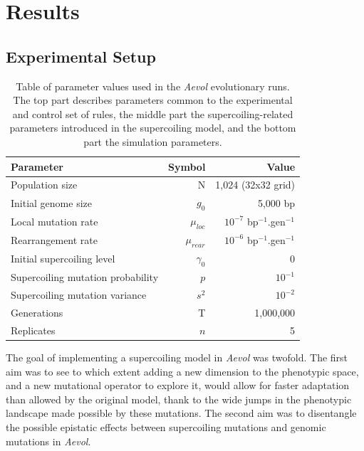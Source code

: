 \section{Results}
\label{sec:aevol:results}

\subsection{Experimental Setup}

\begin{table}[H]
  \begin{center}
    \begin{tabular}{ l  r r }
    \toprule
    \textbf{Parameter} & \textbf{Symbol} & \textbf{Value}\\
    \midrule
    Population size & N & 1,024 (32x32 grid) \\
    Initial genome size & $g_0$ & 5,000 bp \\
    Local mutation rate & $\mu_{loc}$ & $10^{-7}$ bp$^{-1}$.gen$^{-1}$ \\
    Rearrangement rate & $\mu_{rear}$ &$10^{-6}$ bp$^{-1}$.gen$^{-1}$ \\
    \midrule
    Initial supercoiling level & $\gamma_0$ & 0 \\
    Supercoiling mutation probability & $p$ & $10^{-1}$ \\
    Supercoiling mutation variance & $s^2$ & $10^{-2}$ \\
    \midrule
    Generations & T & 1,000,000 \\
    Replicates & $n$ & 5\\
    \bottomrule
    \end{tabular}
    \end{center}
  \caption[Table of parameter values for the \emph{Aevol} runs]{Table of parameter values used in the \emph{Aevol} evolutionary runs.
  The top part describes parameters common to the experimental and control set of rules, the middle part the supercoiling-related parameters introduced in the supercoiling model, and the bottom part the simulation parameters.}
  \label{tab:aevol:param_values}
\end{table}


The goal of implementing a supercoiling model in \emph{Aevol} was twofold.
The first aim was to see to which extent adding a new dimension to the phenotypic space, and a new mutational operator to explore it, would allow for faster adaptation than allowed by the original model, thank to the wide jumps in the phenotypic landscape made possible by these mutations.
The second aim was to disentangle the possible epistatic effects between supercoiling mutations and genomic mutations in \emph{Aevol}.

